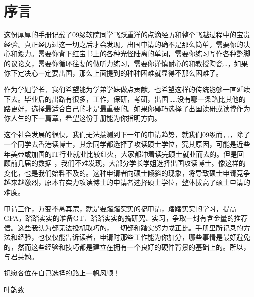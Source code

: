 \chapter*{序言}
\pagestyle{plain}
这份厚厚的手册记载了09级软院同学飞跃重洋的点滴经历和整个飞越过程中的宝贵经验。真正经历过这一切之后才会发现，出国申请的确不是那么简单，需要你的决心和毅力。需要你背下红宝书上的各种光怪陆离的单词，需要你练习写作各种蹩脚的议论文，需要你循环往复的做听力练习，需要你谨慎耐心的和教授陶瓷\ldots{}，如果你下定决心一定要出国，那么上面提到的种种困难就显得不那么困难了。\par

作为学姐学长，我们希望能为学弟学妹做点贡献，也希望这样的传统能够一直延续下去。毕业后的出路有很多，工作，保研，考研，出国……没有哪一条路比其他的路更好，选择最适合自己的才是最重要的。如果你碰巧选择了出国读研或读博作为你人生的下一篇章，希望这份手册能为你指明方向。\par

这个社会发展的很快，我们无法揣测到下一年的申请趋势，就我们09级而言，除了一个同学去香港读博士，其余同学都选择了攻读硕士学位，究其原因，可能是近些年美帝或加国的IT行业就业比较红火，大家都冲着读完硕士就业而去的。但是回顾前几届的数据 ，我们不难发现，大部分学长学姐选择出国攻读博士。像这样的变化，也是我们始料不及的。这种申请者向硕士倾斜的现象，将导致硕士申请竞争越来越激烈，原本有实力攻读博士的申请者选择硕士学位，整体拔高了硕士申请的难度。\par

申请工作，万变不离其宗，就是要踏踏实实的搞申请，踏踏实实的学习，提高GPA，踏踏实实的准备GT，踏踏实实的搞研究、实习，争取一封有含金量的推荐信。这些我认为都无法投机取巧的，一切都和踏实努力成正比。手册里所记录的方法和经验，也仅仅能告诉读者，申请时那些工作能为你加分，哪些事情是最好避免的，然而这些经验和技巧都是建立在拥有一个良好的硬件背景的基础上的。所以，与君共勉。\par

祝愿各位在自己选择的路上一帆风顺！\par
\hspace*{\fill} 叶韵致
\clearpage
